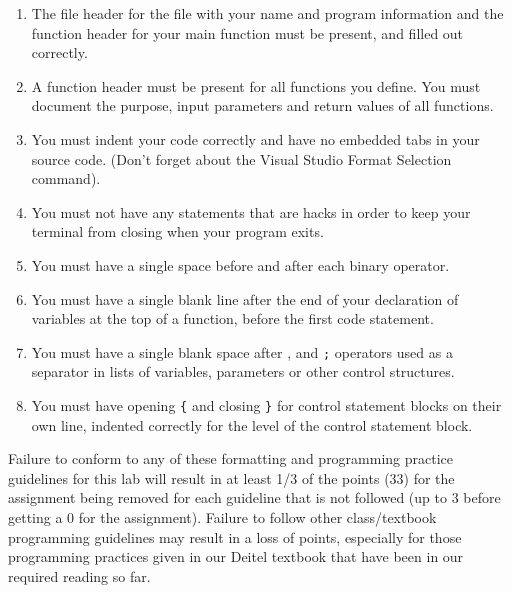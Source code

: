 \documentclass[11pt]{article}
\begin{document}
\begin{enumerate}
\item The file header for the file with your name and program information
and the function header for your main function must be present, and
filled out correctly.
\item A function header must be present for all functions you define.
You must document the purpose, input parameters and return values
of all functions.
\item You must indent your code correctly and have no embedded tabs in
your source code. (Don't forget about the Visual Studio Format
Selection command).
\item You must not have any statements that are hacks in order to keep
your terminal from closing when your program exits.
\item You must have a single space before and after each binary operator.
\item You must have a single blank line after the end of your declaration
of variables at the top of a function, before the first code
statement.
\item You must have a single blank space after , and \verb~;~ operators used as a
separator in lists of variables, parameters or other control
structures.
\item You must have opening \verb~{~ and closing \verb~}~ for control statement blocks
on their own line, indented correctly for the level of the control
statement block.
\end{enumerate}

Failure to conform to any of these formatting and programming practice
guidelines for this lab will result in at least 1/3 of the points (33)
for the assignment being removed for each guideline that is not
followed (up to 3 before getting a 0 for the assignment). Failure to
follow other class/textbook programming guidelines may result in a
loss of points, especially for those programming practices given in
our Deitel textbook that have been in our required reading so far.
\end{document}
